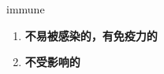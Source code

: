 
\begin{frame}
{\huge immune}
\begin{center}
\begin{enumerate}\Large
  \item \textbf{不易被感染的，有免疫力的}
  \item \textbf{不受影响的}
\end{enumerate}
\end{center}
\end{frame}
